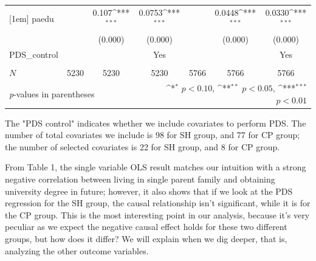 \documentclass[]{AEA}
\def\sym#1{\ifmmode^{#1}\else\(^{#1}\)\fi}
\begin{document}
\begin{center}
\begin{table}
\begin{tabular}{l*{6}c}
    [1em]
    paedu       &                     &       0.107\sym{***}&      0.0753\sym{***}&                     &      0.0448\sym{***}&      0.0330\sym{***}\\
        &                     &     (0.000)         &     (0.000)         &                     &     (0.000)         &     (0.000)         \\
    [1em]
    PDS\_control  &   &  &  Yes    &  &    &  Yes \\
    &   &      &      &   &      &      \\
    \hline
    \(N\)       &        5230         &        5230         &        5230         &        5766         &        5766         &        5766         \\
    \bottomrule
    \multicolumn{3}{l}{\footnotesize \textit{p}-values in parentheses} & \multicolumn{4}{r}{\footnotesize \sym{*} \(p<0.10\), \sym{**} \(p<0.05\), \sym{***} \(p<0.01\)}\\
    \end{tabular}
    \begin{tablenotes}
        The "PDS control" indicates whether we include covariates to perform PDS.  The number of total covariates we include is 98 for SH group, and 77 for CP group; the number of selected covariates is 22 for SH group, and 8 for CP group.
    \end{tablenotes}
    \end{table}
    \end{center}

    From Table 1, the single variable OLS result matches our intuition with a strong negative correlation between living in single parent family and obtaining university degree in future; however, it also shows that if we look at the PDS regression for the SH group, the causal relationship isn't significant, while it is for the CP group. This is the most interesting point in our analysis, because it's very peculiar as we expect the negative causal effect holds for these two different groups, but how does it differ?  We will explain when we dig deeper, that is, analyzing the other outcome variables.
\end{document}
